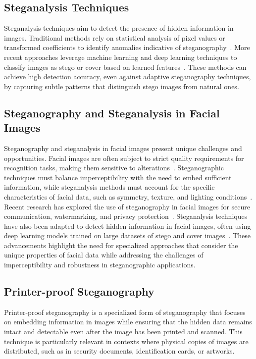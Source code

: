 \subsection{Steganalysis Techniques}\label{sec:steganalysis_techniques}
Steganalysis techniques aim to detect the presence of hidden information in images. Traditional methods rely on statistical analysis of pixel values or transformed coefficients to identify anomalies indicative of steganography~\cite{fridrich2009steganography}. More recent approaches leverage machine learning and deep learning techniques to classify images as stego or cover based on learned features~\cite{cozzolino2015steganalysis, zhang2017survey}. These methods can achieve high detection accuracy, even against adaptive steganography techniques, by capturing subtle patterns that distinguish stego images from natural ones.
\subsection{Steganography and Steganalysis in Facial Images}\label{sec:steganalysis_facial_images}
Steganography and steganalysis in facial images present unique challenges and opportunities. Facial images are often subject to strict quality requirements for recognition tasks, making them sensitive to alterations~\cite{damer2021localfusion}. Steganographic techniques must balance imperceptibility with the need to embed sufficient information, while steganalysis methods must account for the specific characteristics of facial data, such as symmetry, texture, and lighting conditions~\cite{best2018faceqnet}.
Recent research has explored the use of steganography in facial images for secure communication, watermarking, and privacy protection~\cite{damer2021localfusion}. Steganalysis techniques have also been adapted to detect hidden information in facial images, often using deep learning models trained on large datasets of stego and cover images~\cite{terhorst2020serfiq, terhorst2022quality}. These advancements highlight the need for specialized approaches that consider the unique properties of facial data while addressing the challenges of imperceptibility and robustness in steganographic applications.

\subsection{Printer-proof Steganography}\label{sec:printer_proof_steganography}
Printer-proof steganography is a specialized form of steganography that focuses on embedding information in images while ensuring that the hidden data remains intact and detectable even after the image has been printed and scanned. This technique is particularly relevant in contexts where physical copies of images are distributed, such as in security documents, identification cards, or artworks.

